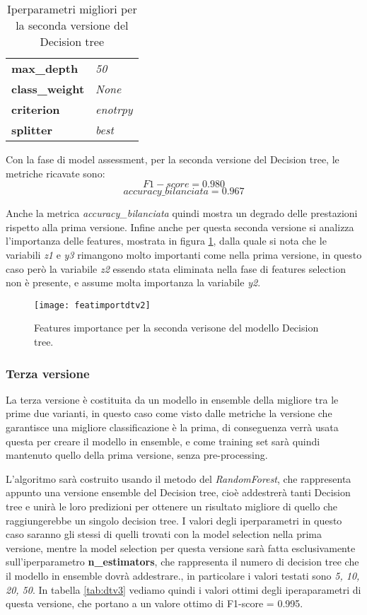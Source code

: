 \begin{table}[h] 
\centering
\begin{tabular}{l l}
\hline
\textbf{max\_depth} & \textit{50}\\
\textbf{class\_weight} & \textit{None}\\
\textbf{criterion} & \textit{enotrpy}\\
\textbf{splitter} & \textit{best}\\
\hline
\end{tabular}
\caption{Iperparametri migliori per la seconda versione del Decision tree}
\label{tab:dtv2}
\end{table}

Con la fase di model assessment, per la seconda versione del Decision tree, le metriche ricavate sono:
$$F1-score = 0.980$$
$$accuracy\_bilanciata = 0.967$$

Anche la metrica \textit{accuracy\_bilanciata} quindi mostra un degrado delle prestazioni rispetto alla prima versione.
Infine anche per questa seconda versione si analizza l'importanza delle features, mostrata in figura \ref{fig:featuresimportancedtv2}, dalla quale si nota che le variabili \textit{z1} e \textit{y3} rimangono molto importanti come nella prima versione, in questo caso però la variabile \textit{z2} essendo stata eliminata nella fase di features selection non è presente, e assume molta importanza la variabile \textit{y2}.

\begin{figure}[h]
    \centering\texttt{[image: featimportdtv2]}
    \caption{Features importance per la seconda verisone del modello Decision tree.}
    \label{fig:featuresimportancedtv2}
\end{figure}

\subsubsection{Terza versione}
La terza versione è costituita da un modello in ensemble della migliore tra le prime due varianti, in questo caso come visto dalle metriche la versione che garantisce una migliore classificazione è la prima, di conseguenza verrà usata questa per creare il modello in ensemble, e come training set sarà quindi mantenuto quello della prima versione, senza pre-processing.

L'algoritmo sarà costruito usando il metodo del \textit{RandomForest}, che rappresenta appunto una versione ensemble del Decision tree, cioè addestrerà tanti Decision tree e unirà le loro predizioni per ottenere un risultato migliore di quello che raggiungerebbe un singolo decision tree. I valori degli iperparametri in questo caso saranno gli stessi di quelli trovati con la model selection nella prima versione, mentre la model selection per questa versione sarà fatta esclusivamente sull'iperparametro \textbf{n\_estimators}, che rappresenta il numero di decision tree che il modello in ensemble dovrà addestrare., in particolare i valori testati sono \textit{5, 10, 20, 50}. In tabella \ref{tab:dtv3} vediamo quindi i valori ottimi degli iperaparametri di questa versione, che portano a un valore ottimo di F1-score = 0.995.

